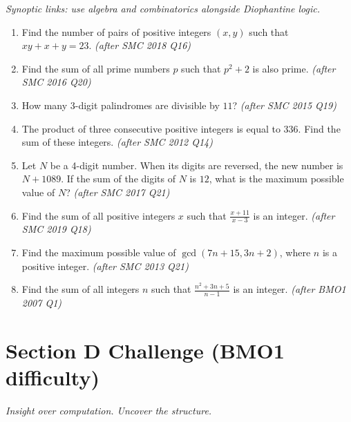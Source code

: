 \documentclass[11pt,a4paper]{article}
\begin{document}
\noindent\textit{Synoptic links: use algebra and combinatorics alongside Diophantine logic.}

\begin{enumerate}

\item Find the number of pairs of positive integers $(x, y)$ such that $xy + x + y = 23$. \textit{\small(after SMC 2018 Q16)}

\item Find the sum of all prime numbers $p$ such that $p^2 + 2$ is also prime. \textit{\small(after SMC 2016 Q20)}

\item How many 3-digit palindromes are divisible by $11$? \textit{\small(after SMC 2015 Q19)}

\item The product of three consecutive positive integers is equal to $336$. Find the sum of these integers. \textit{\small(after SMC 2012 Q14)}

\item Let $N$ be a 4-digit number. When its digits are reversed, the new number is $N + 1089$. If the sum of the digits of $N$ is $12$, what is the maximum possible value of $N$? \textit{\small(after SMC 2017 Q21)}

\item Find the sum of all positive integers $x$ such that $\frac{x+11}{x-3}$ is an integer. \textit{\small(after SMC 2019 Q18)}

\item Find the maximum possible value of $\gcd(7n+15, 3n+2)$, where $n$ is a positive integer. \textit{\small(after SMC 2013 Q21)}

\item Find the sum of all integers $n$ such that $\frac{n^2+3n+5}{n-1}$ is an integer. \textit{\small(after BMO1 2007 Q1)}

\end{enumerate}

\section*{Section D \quad Challenge \hfill{\normalfont\small(BMO1 difficulty)}}

\noindent\textit{Insight over computation. Uncover the structure.}
\end{document}
